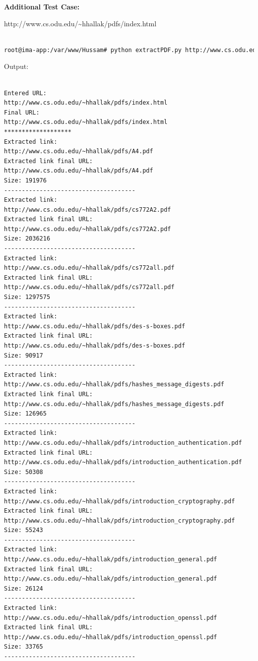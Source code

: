 \documentclass[a4paper, 11pt]{article}
\begin{document}
\noindent
\textbf{Additional Test Case:}

http://www.cs.odu.edu/\textasciitilde hhallak/pdfs/index.html

\begin{lstlisting}[language=bash]

root@ima-app:/var/www/Hussam# python extractPDF.py http://www.cs.odu.edu/~hhallak/pdfs/index.html

\end{lstlisting}
Output:
\begin{lstlisting}[language=bash]

Entered URL:
http://www.cs.odu.edu/~hhallak/pdfs/index.html
Final URL:
http://www.cs.odu.edu/~hhallak/pdfs/index.html
*******************
Extracted link:
http://www.cs.odu.edu/~hhallak/pdfs/A4.pdf
Extracted link final URL:
http://www.cs.odu.edu/~hhallak/pdfs/A4.pdf
Size: 191976
-------------------------------------
Extracted link:
http://www.cs.odu.edu/~hhallak/pdfs/cs772A2.pdf
Extracted link final URL:
http://www.cs.odu.edu/~hhallak/pdfs/cs772A2.pdf
Size: 2036216
-------------------------------------
Extracted link:
http://www.cs.odu.edu/~hhallak/pdfs/cs772all.pdf
Extracted link final URL:
http://www.cs.odu.edu/~hhallak/pdfs/cs772all.pdf
Size: 1297575
-------------------------------------
Extracted link:
http://www.cs.odu.edu/~hhallak/pdfs/des-s-boxes.pdf
Extracted link final URL:
http://www.cs.odu.edu/~hhallak/pdfs/des-s-boxes.pdf
Size: 90917
-------------------------------------
Extracted link:
http://www.cs.odu.edu/~hhallak/pdfs/hashes_message_digests.pdf
Extracted link final URL:
http://www.cs.odu.edu/~hhallak/pdfs/hashes_message_digests.pdf
Size: 126965
-------------------------------------
Extracted link:
http://www.cs.odu.edu/~hhallak/pdfs/introduction_authentication.pdf
Extracted link final URL:
http://www.cs.odu.edu/~hhallak/pdfs/introduction_authentication.pdf
Size: 50308
-------------------------------------
Extracted link:
http://www.cs.odu.edu/~hhallak/pdfs/introduction_cryptography.pdf
Extracted link final URL:
http://www.cs.odu.edu/~hhallak/pdfs/introduction_cryptography.pdf
Size: 55243
-------------------------------------
Extracted link:
http://www.cs.odu.edu/~hhallak/pdfs/introduction_general.pdf
Extracted link final URL:
http://www.cs.odu.edu/~hhallak/pdfs/introduction_general.pdf
Size: 26124
-------------------------------------
Extracted link:
http://www.cs.odu.edu/~hhallak/pdfs/introduction_openssl.pdf
Extracted link final URL:
http://www.cs.odu.edu/~hhallak/pdfs/introduction_openssl.pdf
Size: 33765
-------------------------------------

\end{lstlisting}
\end{document}
